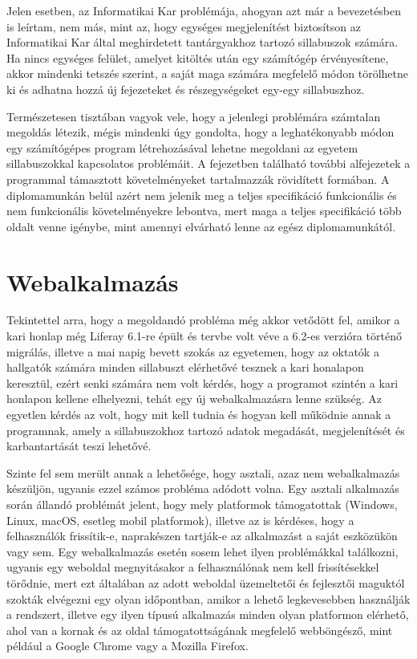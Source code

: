 \documentclass[hidelinks, 12pt, a4paper]{report}
\begin{document}
Jelen esetben, az Informatikai Kar problémája, ahogyan azt már a bevezetésben is leírtam, nem más, mint az, hogy egységes megjelenítést biztosítson az Informatikai Kar által meghirdetett tantárgyakhoz tartozó sillabuszok számára. Ha nincs egységes felület, amelyet kitöltés után egy számítógép érvényesítene, akkor mindenki tetszés szerint, a saját maga számára megfelelő módon törölhetne ki és adhatna hozzá új fejezeteket és részegységeket egy-egy sillabuszhoz.

Természetesen tisztában vagyok vele, hogy a jelenlegi problémára számtalan megoldás létezik, mégis mindenki úgy gondolta, hogy a leghatékonyabb módon egy számítógépes program létrehozásával lehetne megoldani az egyetem sillabuszokkal kapcsolatos problémáit. A fejezetben található további alfejezetek a programmal támasztott követelményeket tartalmazzák rövidített formában. A diplomamunkán belül azért nem jelenik meg a teljes specifikáció funkcionális és nem funkcionális követelményekre lebontva, mert maga a teljes specifikáció több oldalt venne igénybe, mint amennyi elvárható lenne az egész diplomamunkától.

\section{Webalkalmazás}

Tekintettel arra, hogy a megoldandó probléma még akkor vetődött fel, amikor a  kari honlap még Liferay 6.1-re épült és tervbe volt véve a 6.2-es verzióra történő migrálás, illetve a mai napig bevett szokás az egyetemen, hogy az oktatók a hallgatók számára minden sillabuszt elérhetővé tesznek a kari honalapon keresztül, ezért senki számára nem volt kérdés, hogy a programot szintén a kari honlapon kellene elhelyezni, tehát egy új webalkalmazásra lenne szükség. Az egyetlen kérdés az volt, hogy mit kell tudnia és hogyan kell működnie annak a programnak, amely a sillabuszokhoz tartozó adatok megadását, megjelenítését és karbantartását teszi lehetővé.

Szinte fel sem merült annak a lehetősége, hogy asztali, azaz nem webalkalmazás készüljön, ugyanis ezzel számos probléma adódott volna. Egy asztali alkalmazás során állandó problémát jelent, hogy mely platformok támogatottak (Windows, Linux, macOS, esetleg mobil platformok), illetve az is kérdéses, hogy a felhasználók frissítik-e, naprakészen tartják-e az alkalmazást a saját eszközükön vagy sem. Egy webalkalmazás esetén sosem lehet ilyen problémákkal találkozni, ugyanis egy weboldal megnyitásakor a felhasználónak nem kell frissítésekkel törődnie, mert ezt általában az adott weboldal üzemeltetői és fejlesztői maguktól szokták elvégezni egy olyan időpontban, amikor a lehető legkevesebben használják a rendszert, illetve egy ilyen típusú alkalmazás minden olyan platformon elérhető, ahol van a kornak és az oldal támogatottságának megfelelő webböngésző, mint például a Google Chrome vagy a Mozilla Firefox. 
\end{document}
